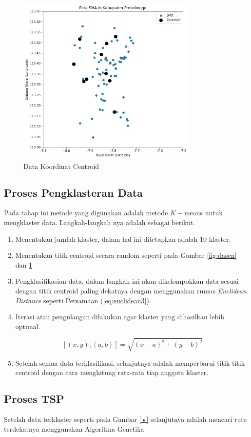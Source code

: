 \begin{figure}[h!]
	\centering
	\includegraphics[width=0.8\textwidth]{titik centroid.png}
	\caption{Data Koordinat Centroid}
	\label{fig:visdasen}
\end{figure}

\subsection{Proses Pengklasteran Data}

Pada tahap ini metode yang digunakan adalah metode $K-$means untuk mengklaster data. Langkah-langkah nya adalah sebagai berikut.

\begin{enumerate}
	\item Menentukan jumlah klaster, dalam hal ini ditetapkan adalah 10 klaster.
	\item Menentukan titik centroid secara random seperti pada Gambar \ref{fig:dasen} dan \ref{fig:visdasen}
	\item Pengklasifikasian data, dalam langkah ini akan dikelompokkan data sesuai dengan titik centroid paling dekatnya dengan menggunakan rumus \textit{Euclidean Distance} seperti Persamaan (\ref{eq:euclidean3}).
	\item Iterasi atau pengulangan dilakukan agar klaster yang dihasilkan lebih optimal.
	
	\begin{equation}
	\left[ \left( x,y \right) ,\left( a,b \right)\right]=\sqrt{\left( x-a \right)^{2}+\left( y-b \right)^{2}}
	\label{eq:euclidean3}
	\end{equation}
	
	\item Setelah semua data terklasifikasi, selanjutnya adalah memperbarui titik-titik centroid dengan cara menghitung rata-rata tiap anggota klaster.
\end{enumerate}

\subsection{Proses TSP}

Setelah data terklaster seperti pada Gambar \ref{•} selanjutnya adalah mencari rute terdekatnya menggunakan Algoritma Genetika